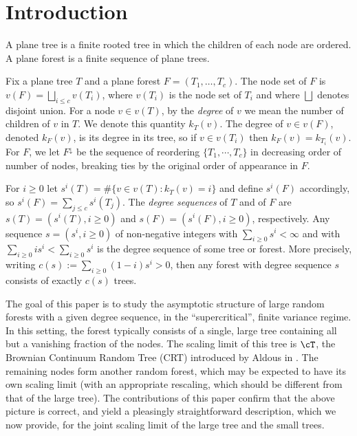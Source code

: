 \section{\bf Introduction}\label{sec:intro} 
A plane tree is a finite rooted tree in which the children of each node are ordered. A plane forest is a finite sequence of plane trees. 

Fix a plane tree $T$ and a plane forest $F=(T_1,\ldots,T_c)$. The node set of $F$ is $v(F) = \bigsqcup_{i \le c} v(T_i)$, where $v(T_i)$ is the node set of $T_i$ and where $\bigsqcup$ denotes disjoint union. For a node $v \in v(T)$, by the {\em degree} of $v$ we mean the number of children of $v$ in $T$. We denote this quantity $k_T(v)$.  The degree of $v \in v(F)$, denoted $k_F(v)$, is its degree in its tree, so if $v \in v(T_i)$ then $k_F(v)=k_{T_i}(v)$. For $F$, we let $F^{\downarrow}$ be the sequence of reordering $\{T_1, \cdots, T_c\}$ in decreasing order of number of nodes, breaking ties by the original order of appearance in $F$.

For $i \ge 0$ let $s^i(T) = \#\{v \in v(T): k_T(v)=i\}$ and define $s^i(F)$ accordingly, so $s^i(F)=\sum_{j \le c} s^i(T_j)$. The {\em degree sequences} of $T$ and of $F$ are $s(T) = (s^i(T),i \ge 0)$ and $s(F) = (s^i(F),i \ge 0)$, respectively. Any sequence $s=(s^i, i\ge 0)$ of non-negative integers with $\sum\limits_{i\ge 0} s^i<\infty$ and with $\sum\limits_{i\ge 0} is^i<\sum\limits_{i\ge 0} s^i$ is the degree sequence of some tree or forest. More precisely, writing $c(s):= \sum\limits_{i\ge 0}(1-i)s^i>0$, then any forest with degree sequence $s$ consists of exactly $c(s)$ trees.

The goal of this paper is to study the asymptotic structure of large random forests with a given degree sequence, in the ``supercritical'', finite variance regime. In this setting, the forest typically consists of a single, large tree containing all but a vanishing fraction of the nodes. The scaling limit of this tree is $\cT$, the Brownian Continuum Random Tree (CRT) introduced by Aldous in \cite{AldousI, AldousII, AldousIII}. The remaining nodes form another random forest, which may be expected to have its own scaling limit (with an appropriate rescaling, which should be different from that of the large tree). The contributions of this paper confirm that the above picture is correct, and yield a pleasingly straightforward description, which we now provide, for the joint scaling limit of the large tree and the small trees. 

